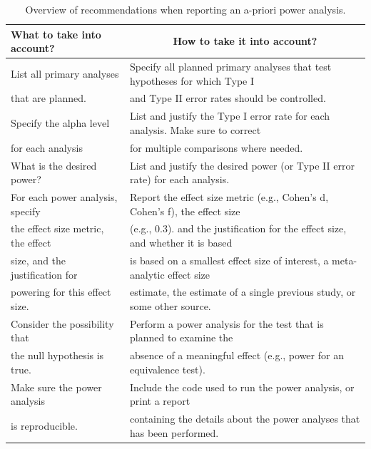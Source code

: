 \documentclass[
  english,
  ,jou, a4paper,floatsintext]{apa6}
\begin{document}
\begin{table}[tbp]

\begin{center}
\begin{threeparttable}

\caption{\label{tab:table-pow-rec-2}Overview of recommendations when reporting an a-priori power analysis.}

\begin{tabular}{ll}
\toprule
What to take into account? & \multicolumn{1}{c}{How to take it into account?}\\
\midrule
List all primary analyses & Specify all planned primary analyses that test hypotheses for which Type I\\
that are planned. & and Type II error rates should be controlled.\\ \midrule
Specify the alpha level & List and justify the Type I error rate for each analysis. Make sure to correct\\
for each analysis & for multiple comparisons where needed.\\ \midrule
What is the desired power? & List and justify the desired power (or Type II error rate) for each analysis.\\ \midrule
For each power analysis, specify & Report the effect size metric (e.g., Cohen's d, Cohen's f), the effect size\\
the effect size metric, the effect & (e.g., 0.3). and the justification for the effect size, and whether it is based\\
size, and the justification for & is based on a smallest effect size of interest, a meta-analytic effect size\\
powering for this effect size. & estimate, the estimate of a single previous study, or some other source.\\ \midrule
Consider the possibility that & Perform a power analysis for the test that is planned to examine the\\
the null hypothesis is true. & absence of a meaningful effect (e.g., power for an equivalence test).\\ \midrule
Make sure the power analysis & Include the code used to run the power analysis, or print a report\\
is reproducible. & containing the details about the power analyses that has been performed.\\
\bottomrule
\end{tabular}

\end{threeparttable}
\end{center}

\end{table}
\end{document}
